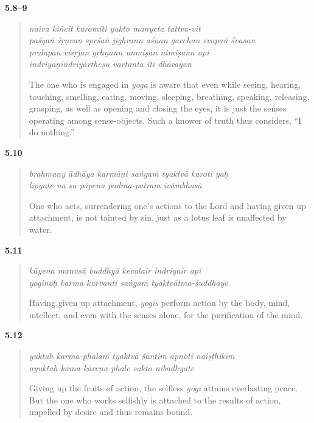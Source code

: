 \par\noindent\textbf{5.8–9}\par
\begin{verse}
\textit{naiva kiñcit karomīti yukto manyeta tattva-vit} \\
\textit{paśyañ śṛṇvan spṛśañ jighrann aśnan gacchan svapañ śvasan} \\
\textit{pralapan visṛjan gṛhṇann unmiṣan nimiṣann api} \\
\textit{indriyāṇīndriyārtheṣu vartanta iti dhārayan}

\noindent The one who is engaged in \textit{yoga} is aware that even while seeing, hearing, touching, smelling, eating, moving, sleeping, breathing, speaking, releasing, grasping, as well as opening and closing the eyes, it is just the senses operating among sense-objects. Such a knower of truth thus considers, \enquote{I do nothing.}
\end{verse}
\par



\par\noindent\textbf{5.10}\par
\begin{verse}
\textit{brahmaṇy ādhāya karmāṇi saṅgaṁ tyaktvā karoti yaḥ} \\
\textit{lipyate na sa pāpena padma-patram ivāmbhasā}

\noindent One who acts, surrendering one’s actions to the Lord and having given up attachment, is not tainted by sin, just as a lotus leaf is unaffected by water.
\end{verse}
\par



\par\noindent\textbf{5.11}\par
\begin{verse}
\textit{kāyena manasā buddhyā kevalair indriyair api} \\
\textit{yoginaḥ karma kurvanti saṅgaṁ tyaktvātma-śuddhaye}

\noindent Having given up attachment, \textit{yogīs} perform action by the body, mind, intellect, and even with the senses alone, for the purification of the mind.
\end{verse}
\par



\par\noindent\textbf{5.12}\par
\begin{verse}
\textit{yuktaḥ karma-phalaṁ tyaktvā śāntim āpnoti naiṣṭhikīm} \\
\textit{ayuktaḥ kāma-kāreṇa phale sakto nibadhyate}

\noindent Giving up the fruits of action, the selfless \textit{yogī} attains everlasting peace. But the one who works selfishly is attached to the results of action, impelled by desire and thus remains bound.
\end{verse}
\par



